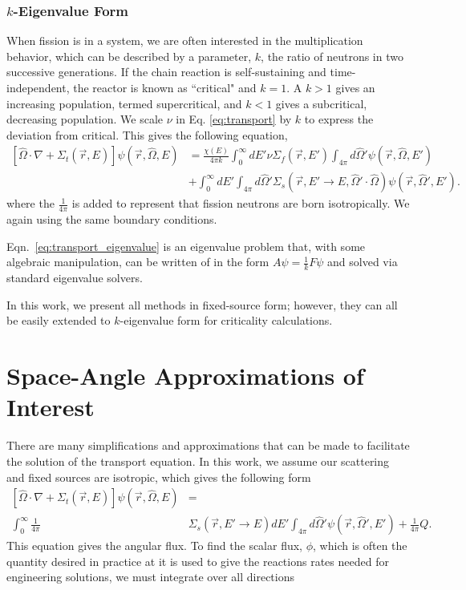 \subsubsection{$k$-Eigenvalue Form}
When fission is in a system, we are often interested in the multiplication behavior, which can be described by a parameter, $k$, the ratio of neutrons in two successive generations. If the chain reaction is self-sustaining and time-independent, the reactor is known as ``critical" and $k=1$. A $k>1$ gives an increasing population, termed supercritical, and $k<1$ gives a subcritical, decreasing population. We scale $\nu$ in Eq. \eqref{eq:transport} by $k$ to express the deviation from critical. This gives the following equation,
%
\begin{equation}
    \label{eq:transport_eigenvalue}
    \begin{split}
        [\hat{\Omega} \cdot \nabla + \Sigma_t(\vec{r}, E)]\psi(\vec{r}, \hat{\Omega}, E) &= \frac{\chi(E)}{4\pi k} \int_0^\infty dE' \nu \Sigma_{f}(\vec{r}, E') \int_{4\pi} d\hat{\Omega}'\psi(\vec{r}, \hat{\Omega}, E') \\ &+ \int_0^\infty dE' \int_{4\pi} d\hat{\Omega}' \Sigma_s(\vec{r}, E' \rightarrow E, \hat{\Omega}' \cdot \hat{\Omega})\psi(\vec{r}, \hat{\Omega}', E').
    \end{split}
\end{equation}
where the $\frac{1}{4\pi}$ is added to represent that fission neutrons are born isotropically. We again using the same boundary conditions. 

Eqn.~\eqref{eq:transport_eigenvalue} is an eigenvalue problem that, with some algebraic manipulation, can be written of in the form $A\psi = \frac{1}{k} F\psi$ and solved via standard eigenvalue solvers. 

In this work, we present all methods in fixed-source form; however, they can all be easily extended to $k$-eigenvalue form for criticality calculations. 

\section{Space-Angle Approximations of Interest}
There are many simplifications and approximations that can be made to facilitate the solution of the transport equation. In this work, we assume our scattering and fixed sources are isotropic, which gives the following form
%
\begin{equation}
\begin{split}

[\hat{\Omega} \cdot \nabla + \Sigma_t(\vec{r}, E)]\psi(\vec{r}, \hat{\Omega}, E) &= \\  \int_0^\infty \frac{1}{4\pi} &\Sigma_s(\vec{r}, E' \rightarrow E)  dE' \int_{4\pi} d\hat{\Omega}'\psi(\vec{r}, \hat{\Omega}', E')  + \frac{1}{4\pi}Q.

\end{split}
 \label{eq:transport_isotropic_scattering}
\end{equation}
%
This equation gives the angular flux. To find the scalar flux, $\phi$, which is often the quantity desired in practice at it is used to give the reactions rates needed for engineering solutions, we must integrate over all directions

